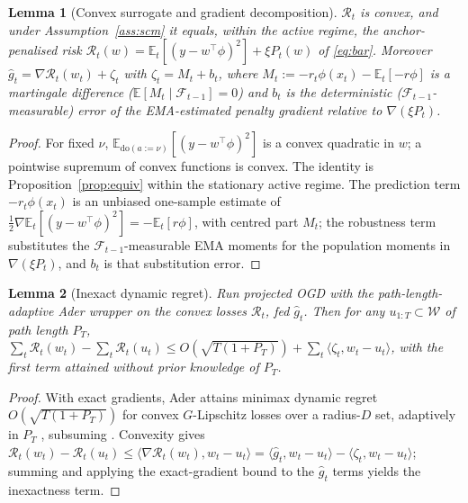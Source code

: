 \documentclass[11pt]{article}
\theoremstyle{plain}
\newtheorem{lemma}{Lemma}
\theoremstyle{remark}
\newcommand{\E}{\mathbb{E}}
\newcommand{\doop}{\mathrm{do}}
\begin{document}
\begin{lemma}[Convex surrogate and gradient decomposition]\label{lem:surrogate}
$\mathcal{R}_t$ is convex, and under Assumption~\ref{ass:scm} it equals, within the active
regime, the anchor-penalised risk $\mathcal{R}_t(w)=\E_t[(y-w^\top\phi)^2]+\xi P_t(w)$ of
\eqref{eq:bar}. Moreover $\hat g_t=\nabla\mathcal{R}_t(w_t)+\zeta_t$ with $\zeta_t=M_t+b_t$,
where $M_t:=-r_t\phi(x_t)-\E_t[-r\phi]$ is a martingale difference
($\E[M_t\mid\mathcal F_{t-1}]=0$) and $b_t$ is the deterministic
($\mathcal F_{t-1}$-measurable) error of the EMA-estimated penalty gradient relative to
$\nabla(\xi P_t)$.
\end{lemma}
\begin{proof}
For fixed $\nu$, $\E_{\doop(a:=\nu)}[(y-w^\top\phi)^2]$ is a convex quadratic in $w$; a
pointwise supremum of convex functions is convex. The identity is
Proposition~\ref{prop:equiv} within the stationary active regime. The prediction term
$-r_t\phi(x_t)$ is an unbiased one-sample estimate of
$\tfrac12\nabla\E_t[(y-w^\top\phi)^2]=-\E_t[r\phi]$, with centred part $M_t$; the
robustness term substitutes the $\mathcal F_{t-1}$-measurable EMA moments for the
population moments in $\nabla(\xi P_t)$, and $b_t$ is that substitution error.
\end{proof}

\begin{lemma}[Inexact dynamic regret]\label{lem:ogd}
Run projected OGD with the path-length-adaptive Ader wrapper
\citep{zhang2018adaptive} on the convex losses $\mathcal{R}_t$, fed $\hat g_t$. Then for any
$u_{1:T}\subset\mathcal{W}$ of path length $P_T$,
$\sum_t\mathcal{R}_t(w_t)-\sum_t\mathcal{R}_t(u_t)\le O(\sqrt{T(1+P_T)})+\sum_t\langle\zeta_t,
w_t-u_t\rangle$, with the first term attained without prior knowledge of $P_T$.
\end{lemma}
\begin{proof}
With exact gradients, Ader attains minimax dynamic regret $O(\sqrt{T(1+P_T)})$ for
convex $G$-Lipschitz losses over a radius-$D$ set, adaptively in $P_T$
\citep{zhang2018adaptive}, subsuming \citet{zinkevich2003ogd,hazan2016oco}. Convexity
gives $\mathcal{R}_t(w_t)-\mathcal{R}_t(u_t)\le\langle\nabla\mathcal{R}_t(w_t),w_t-u_t\rangle=
\langle\hat g_t,w_t-u_t\rangle-\langle\zeta_t,w_t-u_t\rangle$; summing and applying the
exact-gradient bound to the $\hat g_t$ terms yields the inexactness term.
\end{proof}
\end{document}
